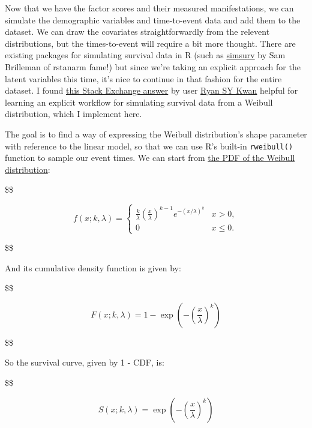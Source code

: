 \documentclass[
  letterpaper,
  DIV=11,
  numbers=noendperiod]{scrreprt}
\begin{document}
Now that we have the factor scores and their measured manifestations, we
can simulate the demographic variables and time-to-event data and add
them to the dataset. We can draw the covariates straightforwardly from
the relevent distributions, but the times-to-event will require a bit
more thought. There are existing packages for simulating survival data
in R (such as
\href{https://cran.r-project.org/web/packages/simsurv/vignettes/simsurv_usage.html}{simsurv}
by Sam Brilleman of rstanarm fame!) but since we're taking an explicit
approach for the latent variables this time, it's nice to continue in
that fashion for the entire dataset. I found
\href{https://stats.stackexchange.com/a/472260/337075}{this Stack
Exchange answer} by user
\href{https://stats.stackexchange.com/users/206635/ryan-sy-kwan}{Ryan SY
Kwan} helpful for learning an explicit workflow for simulating survival
data from a Weibull distribution, which I implement here.

The goal is to find a way of expressing the Weibull distribution's shape
parameter with reference to the linear model, so that we can use R's
built-in \texttt{rweibull()} function to sample our event times. We can
start from \href{https://en.wikipedia.org/wiki/Weibull_distribution}{the
PDF of the Weibull distribution}:

\$\$

\begin{equation}
f(x; k, \lambda) = \begin{cases}
\frac{k}{\lambda} \left( \frac{x}{\lambda} \right)^{k-1} e^{-(x/\lambda)^{k}} & x > 0, \\
0 & x \leq 0.
\end{cases}
\end{equation}

\$\$

And its cumulative density function is given by:

\$\$

\begin{equation}
F(x; k, \lambda) = 1 - \exp\left(-\left(\frac{x}{\lambda}\right)^{k}\right)
\end{equation}

\$\$

So the survival curve, given by 1 - CDF, is:

\$\$

\begin{equation}
S(x; k, \lambda) = \exp\left(-\left(\frac{x}{\lambda}\right)^{k}\right)
\end{equation}
\end{document}
